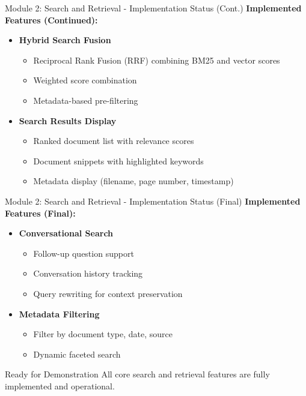 \documentclass[aspectratio=169,xcolor=dvipsnames]{beamer}
\begin{document}
\begin{frame}{Module 2: Search and Retrieval - Implementation Status (Cont.)}
    \large
    \textbf{Implemented Features (Continued):}
    \begin{itemize}
        \item \checkmark \textbf{Hybrid Search Fusion}
        \begin{itemize}
            \normalsize
            \item Reciprocal Rank Fusion (RRF) combining BM25 and vector scores
            \item Weighted score combination
            \item Metadata-based pre-filtering
        \end{itemize}
        
        \vspace{0.5em}
        \item \checkmark \textbf{Search Results Display}
        \begin{itemize}
            \normalsize
            \item Ranked document list with relevance scores
            \item Document snippets with highlighted keywords
            \item Metadata display (filename, page number, timestamp)
        \end{itemize}
    \end{itemize}
\end{frame}

\begin{frame}{Module 2: Search and Retrieval - Implementation Status (Final)}
    \large
    \textbf{Implemented Features (Final):}
    \begin{itemize}
        \item \checkmark \textbf{Conversational Search}
        \begin{itemize}
            \normalsize
            \item Follow-up question support
            \item Conversation history tracking
            \item Query rewriting for context preservation
        \end{itemize}
        
        \vspace{0.5em}
        \item \checkmark \textbf{Metadata Filtering}
        \begin{itemize}
            \normalsize
            \item Filter by document type, date, source
            \item Dynamic faceted search
        \end{itemize}
    \end{itemize}
    
    \vspace{1em}
    \begin{block}{Ready for Demonstration}
        All core search and retrieval features are fully implemented and operational.
    \end{block}
\end{frame}
\end{document}

